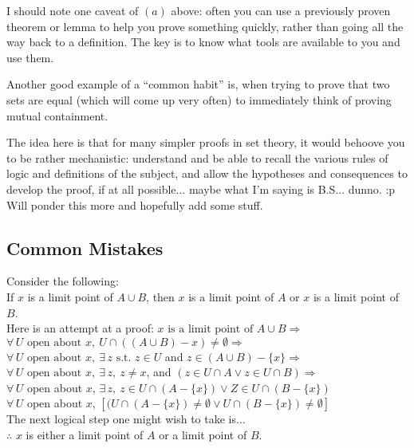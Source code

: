 \documentclass[12pt]{report}
\newcommand{\claim}{ \noindent{\sc Claim }\hspace{5pt} }
\newcommand{\fall}{\forall\,}
\newcommand{\exst}{\exists\,}
\newcommand{\st}{\textrm{ s.t. }}
\begin{document}
I should note one caveat of $(a)$ above: often you can use a previously proven
theorem or lemma to help you prove something quickly, rather than
going all the way back to a definition. The key is to know what tools are
available to you and use them.

Another good example of a ``common habit'' is, when trying to prove that two
sets are equal (which will come up very often) to immediately think of proving
mutual containment. 

The idea here is that for many simpler proofs in set theory, it would behoove
you to be rather mechanistic: understand and be able to recall the various
rules of logic and definitions of the subject, and allow the hypotheses and 
consequences to develop the proof, if at all possible... maybe what I'm saying
is B.S... dunno. :p Will ponder this more and hopefully add some stuff.

\subsection{Common Mistakes}

Consider the following: \\

\claim If $x$ is a limit point of $A \cup B$, then $x$ is a limit point of $A$
or $x$ is a limit point of $B$.\\

Here is an attempt at a proof: 
 $x \textrm{ is a limit point of } A \cup B   \Rightarrow$ \\
 $\fall U \textrm{ open about } x,\ U \cap ((A \cup B) - x) \neq \emptyset
\Rightarrow$ \\
 $\fall U \textrm{ open about } x,\ \exst z \st z \in U$ and $z \in (A \cup B)
 - \{x\} \Rightarrow$ \\
 $\fall U \textrm{ open about } x,\ \exst z,\ z \neq x$, and $(z \in U \cap A
 \lor z \in U \cap B) \Rightarrow$ \\
 $\fall U$ open about $x$, $\exst z,\ z \in U \cap (A - \{x\}) \lor Z \in U
 \cap (B - \{x\})$ \\
 $\fall U$ open about $x$, $[(U \cap (A - \{x\}) \neq \emptyset \lor U \cap (B
-\{x\}) \neq \emptyset]$ \\

The next logical step one might wish to take is...\\
$\therefore$ $x$ is either a limit point of $A$ or a limit point of $B$. \\
\end{document}
